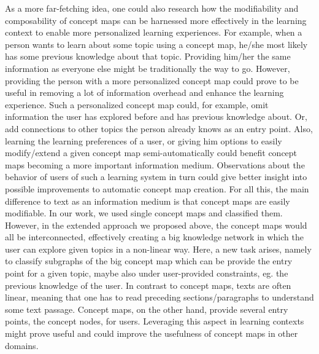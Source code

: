 As a more far-fetching idea, one could also research how the modifiability and composability of concept maps can be harnessed more effectively in the learning context to enable more personalized learning experiences.
For example, when a person wants to learn about some topic using a concept map, he/she most likely has some previous knowledge about that topic.
Providing him/her the same information as everyone else might be traditionally the way to go. 
However, providing the person with a more personalized concept map could prove to be useful in removing a lot of information overhead and enhance the learning experience.
Such a personalized concept map could, for example, omit information the user has explored before and has previous knowledge about.
Or, add connections to other topics the person already knows as an entry point.
Also, learning the learning preferences of a user, or giving him options to easily modify/extend a given concept map semi-automatically could benefit concept maps becoming a more important information medium.
Observations about the behavior of users of such a learning system in turn could give better insight into possible improvements to automatic concept map creation.
For all this, the main difference to text as an information medium is that concept maps are easily modifiable.
In our work, we used single concept maps and classified them.
However, in the extended approach we proposed above, the concept maps would all be interconnected, effectively creating a big knowledge network in which the user can explore given topics in a non-linear way.
Here, a new task arises, namely to classify subgraphs of the big concept map which can be provide the entry point for a given topic, maybe also under user-provided constraints, eg. the previous knowledge of the user.
In contrast to concept maps, texts are often linear, meaning that one has to read preceding sections/paragraphs to understand some text passage.
Concept maps, on the other hand, provide several entry points, the concept nodes, for users.
Leveraging this aspect in learning contexts might prove useful and could improve the usefulness of concept maps in other domains.


